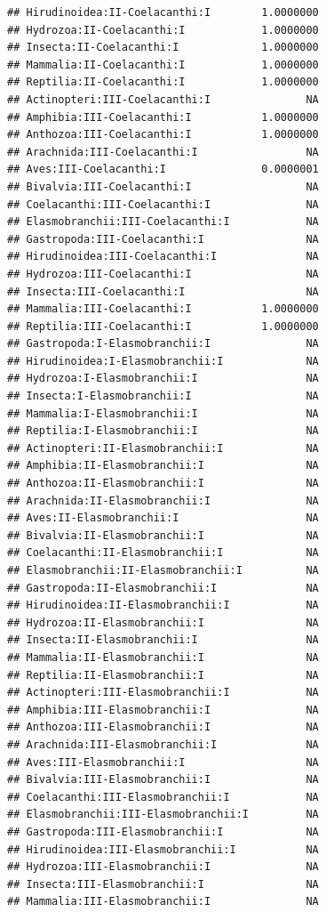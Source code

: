 \documentclass[
  12pt,
]{article}
\begin{document}
\begin{verbatim}
## Hirudinoidea:II-Coelacanthi:I        1.0000000
## Hydrozoa:II-Coelacanthi:I            1.0000000
## Insecta:II-Coelacanthi:I             1.0000000
## Mammalia:II-Coelacanthi:I            1.0000000
## Reptilia:II-Coelacanthi:I            1.0000000
## Actinopteri:III-Coelacanthi:I               NA
## Amphibia:III-Coelacanthi:I           1.0000000
## Anthozoa:III-Coelacanthi:I           1.0000000
## Arachnida:III-Coelacanthi:I                 NA
## Aves:III-Coelacanthi:I               0.0000001
## Bivalvia:III-Coelacanthi:I                  NA
## Coelacanthi:III-Coelacanthi:I               NA
## Elasmobranchii:III-Coelacanthi:I            NA
## Gastropoda:III-Coelacanthi:I                NA
## Hirudinoidea:III-Coelacanthi:I              NA
## Hydrozoa:III-Coelacanthi:I                  NA
## Insecta:III-Coelacanthi:I                   NA
## Mammalia:III-Coelacanthi:I           1.0000000
## Reptilia:III-Coelacanthi:I           1.0000000
## Gastropoda:I-Elasmobranchii:I               NA
## Hirudinoidea:I-Elasmobranchii:I             NA
## Hydrozoa:I-Elasmobranchii:I                 NA
## Insecta:I-Elasmobranchii:I                  NA
## Mammalia:I-Elasmobranchii:I                 NA
## Reptilia:I-Elasmobranchii:I                 NA
## Actinopteri:II-Elasmobranchii:I             NA
## Amphibia:II-Elasmobranchii:I                NA
## Anthozoa:II-Elasmobranchii:I                NA
## Arachnida:II-Elasmobranchii:I               NA
## Aves:II-Elasmobranchii:I                    NA
## Bivalvia:II-Elasmobranchii:I                NA
## Coelacanthi:II-Elasmobranchii:I             NA
## Elasmobranchii:II-Elasmobranchii:I          NA
## Gastropoda:II-Elasmobranchii:I              NA
## Hirudinoidea:II-Elasmobranchii:I            NA
## Hydrozoa:II-Elasmobranchii:I                NA
## Insecta:II-Elasmobranchii:I                 NA
## Mammalia:II-Elasmobranchii:I                NA
## Reptilia:II-Elasmobranchii:I                NA
## Actinopteri:III-Elasmobranchii:I            NA
## Amphibia:III-Elasmobranchii:I               NA
## Anthozoa:III-Elasmobranchii:I               NA
## Arachnida:III-Elasmobranchii:I              NA
## Aves:III-Elasmobranchii:I                   NA
## Bivalvia:III-Elasmobranchii:I               NA
## Coelacanthi:III-Elasmobranchii:I            NA
## Elasmobranchii:III-Elasmobranchii:I         NA
## Gastropoda:III-Elasmobranchii:I             NA
## Hirudinoidea:III-Elasmobranchii:I           NA
## Hydrozoa:III-Elasmobranchii:I               NA
## Insecta:III-Elasmobranchii:I                NA
## Mammalia:III-Elasmobranchii:I               NA

\end{verbatim}
\end{document}
